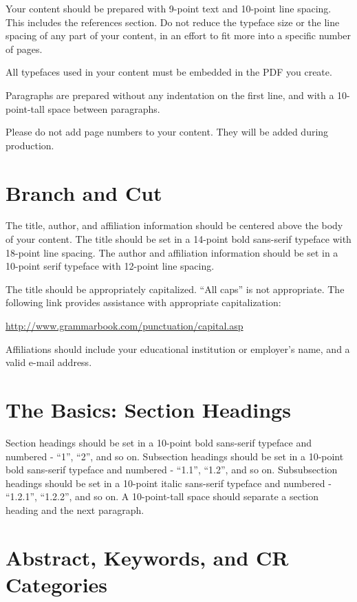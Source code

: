 \documentclass[tog]{acmsiggraph}
\begin{document}
Your content should be prepared with 9-point text and 10-point line
spacing. This includes the references section. Do not reduce the
typeface size or the line spacing of any part of your content, in an
effort to fit more into a specific number of pages. 

All typefaces used in your content must be embedded in the PDF you
create. 

Paragraphs are prepared without any indentation on the first line, and
with a 10-point-tall space between paragraphs.

Please do not add page numbers to your content. They will be added
during production.

\section{Branch and Cut}

The title, author, and affiliation information should be centered
above the body of your content. The title should be set in a 14-point
bold sans-serif typeface with 18-point line spacing. The author and
affiliation information should be set in a 10-point serif typeface
with 12-point line spacing.

The title should be appropriately capitalized. ``All caps'' is not
appropriate. The following link provides assistance with appropriate
capitalization:

{\small\url{http://www.grammarbook.com/punctuation/capital.asp}}

Affiliations should include your educational institution or employer's
name, and a valid e-mail address.

\section{The Basics: Section Headings}

Section headings should be set in a 10-point bold sans-serif typeface
and numbered - ``1'', ``2'', and so on. Subsection headings should be
set in a 10-point bold sans-serif typeface and numbered - ``1.1'',
``1.2'', and so on. Subsubsection headings should be set in a 10-point
italic sans-serif typeface and numbered - ``1.2.1'', ``1.2.2'', and so
on. A 10-point-tall space should separate a section heading and the
next paragraph.

\section{Abstract, Keywords, and CR Categories}
\end{document}
